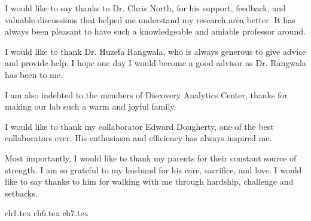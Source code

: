 \documentclass[12pt,dvips]{report}
\begin{document}
I would like to say thanks to Dr. Chris North, for his support, feedback, and valuable discussions that helped me understand my research area better. It has always been pleasant to have such a knowledgeable and amiable professor around.

I would like to thank Dr. Huzefa Rangwala, who is always generous to give advice and provide help. I hope one day I would become a good advisor as Dr. Rangwala has been to me.

I am also indebted to the members of Discovery Analytics Center, thanks for making our lab such a warm and joyful family.

I would like to thank my collaborator Edward Dougherty, one of the best collaborators ever. His enthusiasm and efficiency has always inspired me.

Most importantly, I would like to thank my parents for their constant source of strength. I am so grateful to my husband for his care, sacrifice, and love. I would like to say thanks to him for walking with me through hardship, challenge and setbacks.



\tableofcontents
\pagebreak

\listoffigures
\pagebreak

\listoftables
\pagebreak

\pagestyle{myheadings}

{ch1.tex}%
{ch6.tex}%
{ch7.tex}%



%





\end{document}
